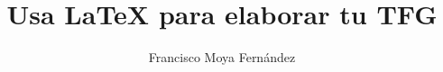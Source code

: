 \documentclass{sty/eiitfg}
\title{Usa \LaTeX{} para elaborar tu TFG}
\author{Francisco Moya Fernández}
\begin{document}
\portada

	   



\indices
















\appendix


\end{document}
